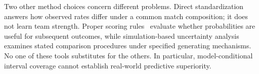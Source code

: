Two other method choices concern different problems. Direct standardization answers how observed rates differ under a common match composition; it does not learn team strength. Proper scoring rules~\cite{gneiting2007scoring} evaluate whether probabilities are useful for subsequent outcomes, while simulation-based uncertainty analysis examines stated comparison procedures under specified generating mechanisms. No one of these tools substitutes for the others. In particular, model-conditional interval coverage cannot establish real-world predictive superiority.
